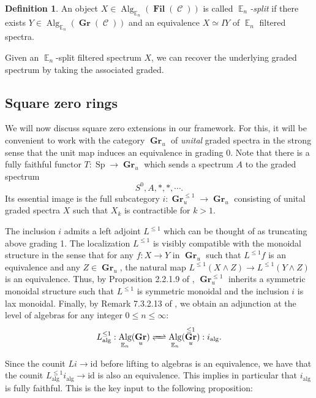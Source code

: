 \documentclass[reqno, oneside]{amsart}
\theoremstyle{definition}
\newtheorem{dfn}[nul]{Definition}
\theoremstyle{plain}
\DeclareMathOperator{\C}{\mathcal{C}}
\DeclareMathOperator{\E}{\mathbb{E}}
\DeclareMathOperator{\Gr}{\textbf{Gr}}
\DeclareMathOperator{\Fil}{\textbf{Fil}}
\DeclareMathOperator{\Alg}{\text{Alg}}
\DeclareMathOperator{\Sp}{\text{Sp}}
\begin{document}
\begin{dfn}
An object $X\in \Alg_{\E_n}(\Fil(\C))$ is called \emph{$\E_n$-split} if there exists $Y\in \Alg_{\E_n}(\Gr(\C))$ and an equivalence $X \simeq IY$ of $\E_n$ filtered spectra.  
\end{dfn}

Given an $\E_n$-split filtered spectrum $X$, we can recover the underlying graded spectrum by taking the associated graded. 

\subsection{Square zero rings}

We will now discuss square zero extensions in our framework.  For this, it will be convenient to work with the category $\Gr_u$ of \emph{unital} graded spectra in the strong sense that the unit map induces an equivalence in grading 0.  
Note that there is a fully faithful functor $T:\Sp \to \Gr_u$ which sends a spectrum $A$ to the graded spectrum $$S^0, A, *, *, \cdots.$$  Its essential image is the full subcategory $i: \Gr^{\leq 1}_u \to \Gr_u$ consisting of unital graded spectra $X$ such that $X_k$ is contractible for $k>1$.  

The inclusion $i$ admits a left adjoint $L^{\leq 1}$ which can be thought of as truncating above grading 1.  The localization $L^{\leq 1}$ is visibly compatible with the monoidal structure in the sense that for any $f:X\to Y$ in $\Gr_u$ such that $L^{\leq 1}f$ is an equivalence and any $Z\in \Gr_u$, the natural map $L^{\leq 1} (X\wedge Z) \to L^{\leq 1}(Y\wedge Z)$ is an equivalence.  Thus, by Proposition 2.2.1.9 of \cite{HA}, $\Gr_u^{\leq 1}$ inherits a symmetric monoidal structure such that $L^{\leq 1}$ is symmetric monoidal and the inclusion $i$ is lax monoidal.  Finally, by Remark 7.3.2.13 of \cite{HA}, we obtain an adjunction at the level of algebras for any integer $0\leq n\leq \infty$:
$$L^{\leq 1}_{\text{alg}}: \Alg_{\E_n}( \Gr_u)  \xrightleftharpoons{\quad} \Alg_{\E_n}(\Gr_u^{\leq 1}) : i_{\text{alg}}.$$

Since the counit $Li \to \text{id}$ before lifting to algebras is an equivalence, we have that the counit $L^{\leq 1}_{\text{alg}}  i_{\text{alg}} \to \text{id}$ is also an equivalence.  This implies in particular that $i_{\text{alg}}$ is fully faithful.  This is the key input to the following proposition:
\end{document}
